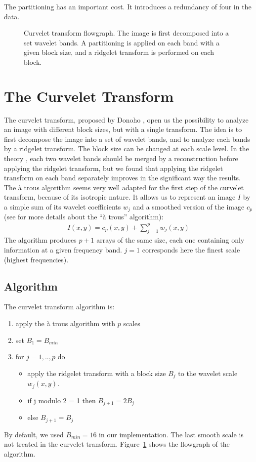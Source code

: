 \documentclass{article}
\begin{document}
The partitioning has an important cost. It introduces a redundancy of four 
in the data.

\begin{figure}[htb]
\centerline{
\hbox{}}
\caption{Curvelet transform flowgraph. The image 
is first decomposed into a set wavelet bands. A partitioning
is applied on each band with a given block size, and a ridgelet transform
is performed on each block.}
\label{fig_curvelet}
\end{figure}

\section{The Curvelet Transform}

The curvelet transform, proposed by Donoho \cite{cur:donoho99,cur:candes99_3},
open us the possibility to analyze an image with different block sizes, but
with a single transform. The idea is to first decompose the image into
a set of wavelet bands, and to analyze each bands by a ridgelet transform.
The block size can be changed at each scale level. 
In the theory \cite{cur:donoho99}, each two wavelet bands should be merged
by a reconstruction before applying the ridgelet transform, but we found 
that applying the ridgelet transform on each band separately improves
in the significant way the results. The \`a trous algorithm seems very well
adapted for the first step of the curvelet transform, because of its 
isotropic nature. It allows us to represent an
image $I$ by a simple sum of its wavelet coefficients $w_j$ and a
smoothed version of the image $c_{p}$ (see \cite{starck:book98} for more details
about the ``\`a trous'' algorithm):
\begin{eqnarray}
I(x,y) = c_{p}(x,y) + \sum_{j=1}^{p} w_j(x,y)
\end{eqnarray}
The algorithm produces $p+1$ arrays of the same size, each one
containing only information at a given frequency band. $j=1$ corresponds here
the finest scale (highest frequencies). 

\subsection{Algorithm}
The curvelet transform algorithm is:
\begin{enumerate}
\item apply the \`a trous algorithm with $p$ scales
\item set $B_1 = B_{min}$
\item for $j=1, .., p$ do 
\begin{itemize}
\item apply the ridgelet transform with a block size $B_j$ to 
the wavelet scale $w_j(x,y)$.
\item if j modulo 2 = 1 then $B_{j+1} = 2 B_{j}$
\item else $B_{j+1} = B_{j}$
\end{itemize}
\end{enumerate}
By default, we used $B_{min} = 16$ in our implementation. The last smooth
scale is not treated in the curvelet transform.
Figure~\ref{fig_curvelet} shows the flowgraph of the algorithm.
\end{document}
